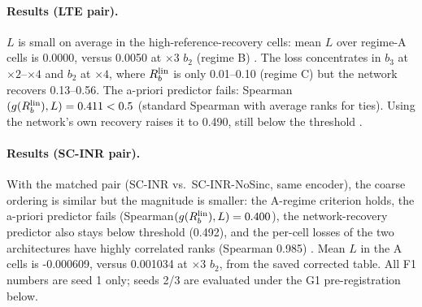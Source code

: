 \paragraph{Results (LTE pair).} $L$ is small on average in the high-reference-recovery cells: mean $L$ over
regime-A cells is 0.0000, versus 0.0050 at $\times3$ $b_2$ (regime B)
. The loss concentrates in $b_3$ at $\times2$--$\times4$
and $b_2$ at $\times4$, where $R_b^{\mathrm{lin}}$ is only 0.01--0.10 (regime C) but the
network recovers 0.13--0.56. The a-priori predictor fails:
Spearman$(g(R_b^{\mathrm{lin}}),L)=0.411<0.5$ (standard Spearman with average ranks for
ties). Using the network's own recovery raises it to 0.490, still below the
threshold .

\paragraph{Results (SC-INR pair).} With the matched pair (SC-INR vs.\
SC-INR-NoSinc, same encoder), the coarse ordering is similar but the magnitude is smaller: the A-regime criterion
holds, the a-priori predictor fails (Spearman$(g(R_b^{\mathrm{lin}}),L)=0.400$), the
network-recovery predictor also stays below threshold (0.492), and the
per-cell losses of the two architectures have highly correlated ranks (Spearman 0.985)
\src{F1-corr2}. Mean $L$ in the A cells is -0.000609, versus 0.001034 at $\times3$ $b_2$, from the saved corrected table. All F1 numbers are seed 1 only; seeds 2/3
are evaluated under the G1 pre-registration below.


